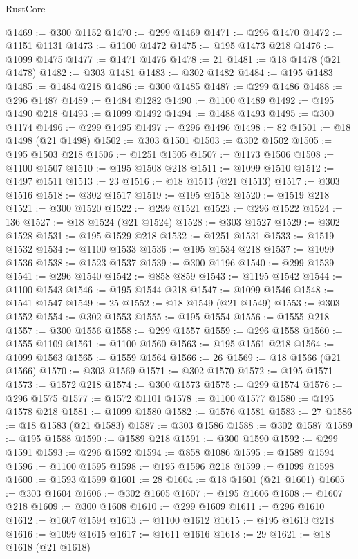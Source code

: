 \begin{lexlean}{RustCore}
\begin{coremodule}
@1469 := @300 @1152
@1470 := @299 @1469
@1471 := @296 @1470
@1472 := @1151 @1131
@1473 := @1100 @1472
@1475 := @195 @1473 @218
@1476 := @1099 @1475
@1477 := @1471 @1476
@1478 := 21
@1481 := @18 @1478 (@21 @1478)
@1482 := @303 @1481
@1483 := @302 @1482
@1484 := @195 @1483
@1485 := @1484 @218
@1486 := @300 @1485
@1487 := @299 @1486
@1488 := @296 @1487
@1489 := @1484 @1282
@1490 := @1100 @1489
@1492 := @195 @1490 @218
@1493 := @1099 @1492
@1494 := @1488 @1493
@1495 := @300 @1174
@1496 := @299 @1495
@1497 := @296 @1496
@1498 := 82
@1501 := @18 @1498 (@21 @1498)
@1502 := @303 @1501
@1503 := @302 @1502
@1505 := @195 @1503 @218
@1506 := @1251 @1505
@1507 := @1173 @1506
@1508 := @1100 @1507
@1510 := @195 @1508 @218
@1511 := @1099 @1510
@1512 := @1497 @1511
@1513 := 23
@1516 := @18 @1513 (@21 @1513)
@1517 := @303 @1516
@1518 := @302 @1517
@1519 := @195 @1518
@1520 := @1519 @218
@1521 := @300 @1520
@1522 := @299 @1521
@1523 := @296 @1522
@1524 := 136
@1527 := @18 @1524 (@21 @1524)
@1528 := @303 @1527
@1529 := @302 @1528
@1531 := @195 @1529 @218
@1532 := @1251 @1531
@1533 := @1519 @1532
@1534 := @1100 @1533
@1536 := @195 @1534 @218
@1537 := @1099 @1536
@1538 := @1523 @1537
@1539 := @300 @1196
@1540 := @299 @1539
@1541 := @296 @1540
@1542 := @858 @859
@1543 := @1195 @1542
@1544 := @1100 @1543
@1546 := @195 @1544 @218
@1547 := @1099 @1546
@1548 := @1541 @1547
@1549 := 25
@1552 := @18 @1549 (@21 @1549)
@1553 := @303 @1552
@1554 := @302 @1553
@1555 := @195 @1554
@1556 := @1555 @218
@1557 := @300 @1556
@1558 := @299 @1557
@1559 := @296 @1558
@1560 := @1555 @1109
@1561 := @1100 @1560
@1563 := @195 @1561 @218
@1564 := @1099 @1563
@1565 := @1559 @1564
@1566 := 26
@1569 := @18 @1566 (@21 @1566)
@1570 := @303 @1569
@1571 := @302 @1570
@1572 := @195 @1571
@1573 := @1572 @218
@1574 := @300 @1573
@1575 := @299 @1574
@1576 := @296 @1575
@1577 := @1572 @1101
@1578 := @1100 @1577
@1580 := @195 @1578 @218
@1581 := @1099 @1580
@1582 := @1576 @1581
@1583 := 27
@1586 := @18 @1583 (@21 @1583)
@1587 := @303 @1586
@1588 := @302 @1587
@1589 := @195 @1588
@1590 := @1589 @218
@1591 := @300 @1590
@1592 := @299 @1591
@1593 := @296 @1592
@1594 := @858 @1086
@1595 := @1589 @1594
@1596 := @1100 @1595
@1598 := @195 @1596 @218
@1599 := @1099 @1598
@1600 := @1593 @1599
@1601 := 28
@1604 := @18 @1601 (@21 @1601)
@1605 := @303 @1604
@1606 := @302 @1605
@1607 := @195 @1606
@1608 := @1607 @218
@1609 := @300 @1608
@1610 := @299 @1609
@1611 := @296 @1610
@1612 := @1607 @1594
@1613 := @1100 @1612
@1615 := @195 @1613 @218
@1616 := @1099 @1615
@1617 := @1611 @1616
@1618 := 29
@1621 := @18 @1618 (@21 @1618)

\end{coremodule}
\end{lexlean}
